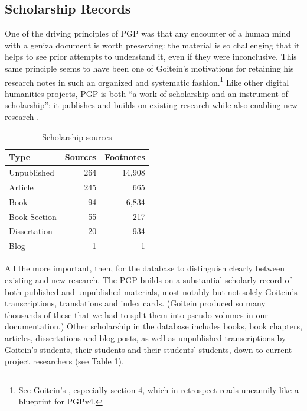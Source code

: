 \documentclass{article}
\begin{document}
\subsection{Scholarship Records}

One of the driving principles of PGP was that any encounter of a human mind with a geniza document is worth preserving: the material is so challenging that it helps to see prior attempts to understand it, even if they were inconclusive. This same principle seems to have been one of Goitein's motivations for retaining his research notes in such an organized and systematic fashion.\footnote{See Goitein's , especially section 4, which in retrospect reads uncannily like a blueprint for PGPv4.} Like other digital humanities projects, PGP is both “a work of scholarship and an instrument of scholarship”: it publishes and builds on existing research while also enabling new research \autocite[2]{kotin_world_2024}.

\begin{table}
\caption{Scholarship sources}
\label{table:scholarship_sources}
\begin{tabular}{lrr}
\toprule
Type & Sources & Footnotes \\
\midrule
Unpublished & 264 & 14,908 \\
Article & 245 & 665 \\
Book & 94 & 6,834 \\
Book Section & 55 & 217 \\
Dissertation & 20 & 934  \\
Blog & 1 & 1 \\
\bottomrule
\end{tabular}
\end{table}
All the more important, then, for the database to distinguish clearly between existing and new research. The PGP builds on a substantial scholarly record of both published and unpublished materials, most notably but not solely Goitein’s transcriptions, translations and index cards. (Goitein produced so many thousands of these that we had to split them into pseudo-volumes in our documentation.) Other scholarship in the database includes books, book chapters, articles, dissertations and blog posts, as well as unpublished transcriptions by Goitein’s students, their students and their students’ students, down to current project researchers (see Table \ref{table:scholarship_sources}). 
\end{document}

